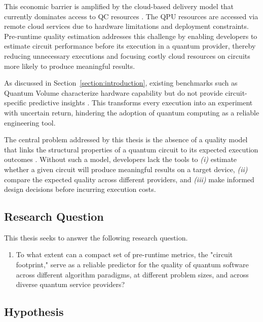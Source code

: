 \documentclass{article}
\begin{document}
This economic barrier is amplified by the cloud-based delivery model that currently dominates access to QC resources \cite{mnaathrIntegratingQuantumComputing}. The QPU resources are accessed via remote cloud services due to hardware limitations and deployment constraints. Pre-runtime quality estimation addresses this challenge by enabling developers to estimate circuit performance before its execution in a quantum provider, thereby reducing unnecessary executions and focusing costly cloud resources on circuits more likely to produce meaningful results.

As discussed in Section~\ref{section:introduction}, existing benchmarks such as Quantum Volume \cite{proctorBenchmarkingQuantumComputers2025_2025} characterize hardware capability but do not provide circuit-specific predictive insights \cite{millsApplicationMotivatedHolistic2021}. This transforms every execution into an experiment with uncertain return, hindering the adoption of quantum computing as a reliable engineering tool.

The central problem addressed by this thesis is the absence of a quality model that links the structural properties of a quantum circuit to its expected execution outcomes \cite{Piattini2020, Serrano2022}. Without such a model, developers lack the tools to \emph{(i)} estimate whether a given circuit will produce meaningful results on a target device, \emph{(ii)} compare the expected quality across different providers, and \emph{(iii)} make informed design decisions before incurring execution costs.

\subsection{Research Question}

This thesis seeks to answer the following research question.

\begin{enumerate}[font=\bfseries]
\item[RQ] To what extent can a compact set of pre-runtime metrics, the "circuit footprint," serve as a reliable predictor for the quality of quantum software across different algorithm paradigms, at different problem sizes, and across diverse quantum service providers?
\end{enumerate}

\subsection{Hypothesis}
\end{document}
